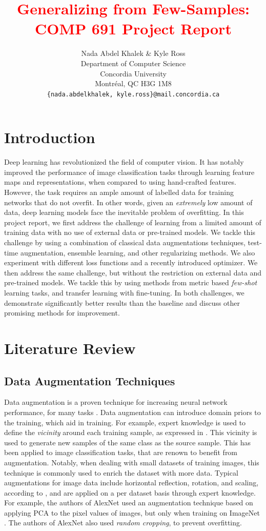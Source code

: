\documentclass[a4paper,11pt]{article}
\title{\textcolor{red}{Generalizing from Few-Samples: COMP 691 Project Report}}
\author{%
  Nada Abdel Khalek \& Kyle Ross\\
  Department of Computer Science\\
  Concordia University\\
  Montréal, QC H3G 1M8 \\
  \texttt{\{nada.abdelkhalek, kyle.ross\}@mail.concordia.ca} \\
}
\begin{document}
\maketitle
\section{Introduction}
 Deep learning has revolutionized the field of computer vision. It has notably improved the performance of image classification tasks through learning feature maps and representations, when compared to using hand-crafted features. However, the task requires an ample amount of labelled data for training networks that do not overfit. In other words, given an \textit{extremely} low amount of data, deep learning models face the inevitable problem of overfitting. In this project report, we first address the challenge of learning from a limited amount of training data with no use of external data or pre-trained models. We tackle this challenge by using a combination of classical data augmentations techniques, test-time augmentation, ensemble learning, and other regularizing methods. We also experiment with different loss functions and a recently introduced optimizer. We then address the same challenge, but without the restriction on external data and pre-trained models. We tackle this by using methods from metric based \textit{few-shot} learning tasks, and transfer learning with fine-tuning. In both challenges, we demonstrate significantly better results than the baseline and discuss other promising methods for improvement.
\section{Literature Review}
\subsection{Data Augmentation Techniques}

Data augmentation is a proven technique for increasing neural network performance, for many tasks \cite{simard1998}. Data augmentation can introduce domain priors to the training, which aid in training. For example, expert knowledge is used to define the \textit{vicinity} around each training sample, as expressed in \cite{chapelle2001}. This vicinity is used to generate new samples of the same class as the source sample. This has been applied to image classification tasks, that are renown to benefit from augmentation. Notably, when dealing with small datasets of training images, this technique is commonly used to enrich the dataset with more data. Typical augmentations for image data include horizontal reflection, rotation, and scaling, according to \cite{zhang2017mixup}, and are applied on a per dataset basis through expert knowledge. For example, the authors of AlexNet used an augmentation technique based on applying PCA to the pixel values of images, but only when training on ImageNet \cite{alexnet}. The authors of AlexNet also used \textit{random cropping}, to prevent overfitting.
\end{document}
